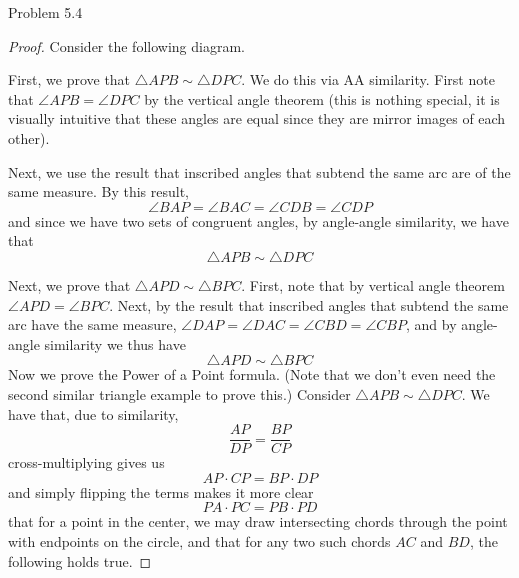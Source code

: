 \begin{sol}{Problem 5.4}
\begin{proof}
Consider the following diagram.
\begin{center}
\end{center}

First, we prove that $\triangle APB \sim \triangle DPC$. We do this via AA similarity. First note that $\angle APB = \angle DPC$ by the vertical angle theorem (this is nothing special, it is visually intuitive that these angles are equal since they are mirror images of each other). 

Next, we use the result that inscribed angles that subtend the same arc are of the same measure. By this result,
\[
\angle BAP = \angle BAC = \angle CDB = \angle CDP
\]
and since we have two sets of congruent angles, by angle-angle similarity, we have that
\[
\triangle APB \sim \triangle DPC
\]

Next, we prove that $\triangle APD \sim \triangle BPC$. First, note that by vertical angle theorem $\angle APD = \angle BPC$. Next, by the result that inscribed angles that subtend the same arc have the same measure, $\angle DAP = \angle DAC = \angle CBD = \angle CBP$, and by angle-angle similarity we thus have
\[
\triangle APD \sim \triangle BPC
\]
Now we prove the Power of a Point formula. (Note that we don't even need the second similar triangle example to prove this.) Consider $\triangle APB \sim \triangle DPC$. We have that, due to similarity,
\[
\frac{AP}{DP} = \frac{BP}{CP}
\]
cross-multiplying gives us
\[
AP \cdot CP = BP \cdot DP
\]
and simply flipping the terms makes it more clear
\[
PA \cdot PC = PB \cdot PD
\]
that for a point in the center, we may draw intersecting chords through the point with endpoints on the circle, and that for any two such chords $AC$ and $BD$, the following holds true.
\end{proof}
\end{sol}

